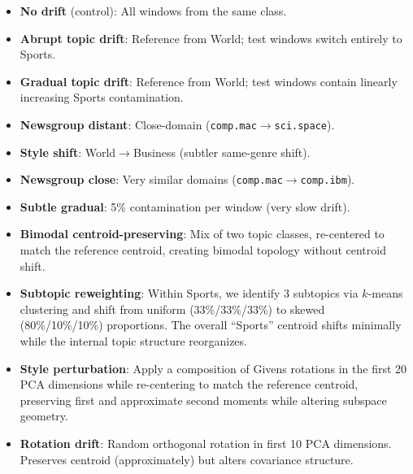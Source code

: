 \begin{itemize}[leftmargin=*,itemsep=2pt,topsep=2pt]
    \item \textbf{No drift} (control): All windows from the same class.
    \item \textbf{Abrupt topic drift}: Reference from World; test windows switch entirely to Sports.
    \item \textbf{Gradual topic drift}: Reference from World; test windows contain linearly increasing Sports contamination.
    \item \textbf{Newsgroup distant}: Close-domain (\texttt{comp.mac}$\to$\texttt{sci.space}).
\end{itemize}

\begin{itemize}[leftmargin=*,itemsep=2pt,topsep=2pt]
    \item \textbf{Style shift}: World$\to$Business (subtler same-genre shift).
    \item \textbf{Newsgroup close}: Very similar domains (\texttt{comp.mac}$\to$\texttt{comp.ibm}).
    \item \textbf{Subtle gradual}: 5\% contamination per window (very slow drift).
\end{itemize}

\begin{itemize}[leftmargin=*,itemsep=2pt,topsep=2pt]
    \item \textbf{Bimodal centroid-preserving}: Mix of two topic classes, re-centered to match the reference centroid, creating bimodal topology without centroid shift.
    \item \textbf{Subtopic reweighting}: Within Sports, we identify 3 subtopics via $k$-means clustering and shift from uniform (33\%/33\%/33\%) to skewed (80\%/10\%/10\%) proportions. The overall ``Sports'' centroid shifts minimally while the internal topic structure reorganizes.
    \item \textbf{Style perturbation}: Apply a composition of Givens rotations in the first 20 PCA dimensions while re-centering to match the reference centroid, preserving first and approximate second moments while altering subspace geometry.
\end{itemize}

\begin{itemize}[leftmargin=*,itemsep=2pt,topsep=2pt]
    \item \textbf{Rotation drift}: Random orthogonal rotation in first 10 PCA dimensions. Preserves centroid (approximately) but alters covariance structure.
\end{itemize}

